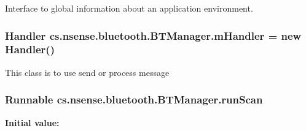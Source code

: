 Interface to global information about an application environment. \hypertarget{classcs_1_1nsense_1_1bluetooth_1_1_b_t_manager_a263dface8630bc473a0df38eecca70da}{
\subsubsection[{m\-Handler}]{\setlength{\rightskip}{0pt plus 5cm}Handler cs.\-nsense.\-bluetooth.\-B\-T\-Manager.\-m\-Handler = new Handler()\hspace{0.3cm}{\ttfamily [private]}}}\label{classcs_1_1nsense_1_1bluetooth_1_1_b_t_manager_a263dface8630bc473a0df38eecca70da}
This class is to use send or process message \hypertarget{classcs_1_1nsense_1_1bluetooth_1_1_b_t_manager_a3268dadae9d20d70f91c47f762e9e8f9}{
\subsubsection[{run\-Scan}]{\setlength{\rightskip}{0pt plus 5cm}Runnable cs.\-nsense.\-bluetooth.\-B\-T\-Manager.\-run\-Scan\hspace{0.3cm}{\ttfamily [private]}}}\label{classcs_1_1nsense_1_1bluetooth_1_1_b_t_manager_a3268dadae9d20d70f91c47f762e9e8f9}
{\bfseries Initial value\-:}
